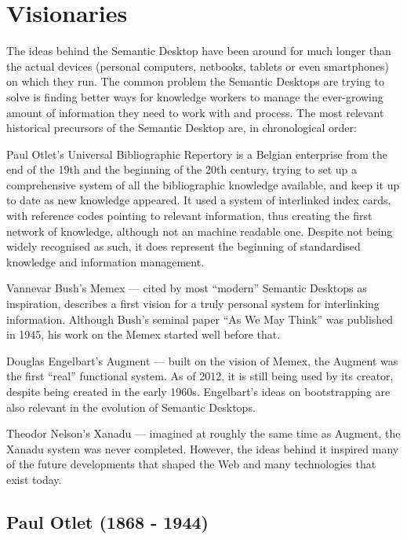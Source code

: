 \section{Visionaries}
\label{sec:visionaries}

The ideas behind the Semantic Desktop have been around for much longer than the actual devices (personal computers, netbooks, tablets or even smartphones) on which they run. The common problem the Semantic Desktops are trying to solve is finding better ways for knowledge workers to manage the ever-growing amount of information they need to work with and process. 
The most relevant historical precursors of the Semantic Desktop are, in chronological order:

Paul Otlet's Universal Bibliographic Repertory is a Belgian enterprise from the end of the 19th and the beginning of the 20th century, trying to set up a comprehensive system of all the bibliographic knowledge available, and keep it up to date as new knowledge appeared. It used a system of interlinked index cards, with reference codes pointing to relevant information, thus creating the first network of knowledge, although not an machine readable one. Despite not being widely recognised as such, it does represent the beginning of standardised knowledge and information management.

Vannevar Bush's Memex --- cited by most ``modern'' Semantic Desktops as inspiration, describes a first vision for a truly personal system for interlinking information. Although Bush's seminal paper ``As We May Think'' was published in 1945, his work on the Memex started well before that.

Douglas Engelbart's Augment --- built on the vision of Memex, the Augment was the first ``real'' functional system. As of 2012, it is still being used by its creator, despite being created in the early 1960s. Engelbart's ideas on bootstrapping are also relevant in the evolution of Semantic Desktops. 

Theodor Nelson's Xanadu --- imagined at roughly the same time as Augment, the Xanadu system was never completed. However, the ideas behind it inspired many of the future developments that shaped the Web and many technologies that exist today.

\subsection{Paul Otlet (1868 - 1944)}
\label{sec:otlet}

